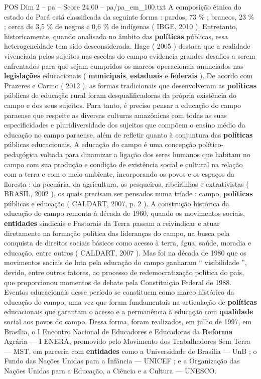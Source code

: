 \begin{textsample}{POS Dim 2 – pa – Score 24.00 – pa/pa\_em\_100.txt}
A composição étnica do estado do Pará está classificada da seguinte forma : pardos, 73 \% ; brancos, 23 \% ; cerca de 3,5 \% de negros e 0,6 \% de indígenas ( IBGE, 2010 ).
Entretanto, historicamente, quando analisada no âmbito das \textbf{políticas} públicas, essa heterogeneidade tem sido desconsiderada.
Hage ( 2005 ) destaca que a realidade vivenciada pelos sujeitos nas escolas do campo evidencia grandes desafios a serem enfrentados para que sejam cumpridos os marcos operacionais anunciados nas \textbf{legislações} educacionais ( \textbf{municipais}, \textbf{estaduais} e \textbf{federais} ).
De acordo com Prazeres e Carmo ( 2012 ), as formas tradicionais que desenvolveram as \textbf{políticas} públicas de educação rural foram desqualificadoras da própria existência do campo e dos seus sujeitos.
Para tanto, é preciso pensar a educação do campo paraense que respeite as diversas culturas amazônicas com todas as suas especificidades e pluridiversidade dos sujeitos que compõem o ensino médio da educação no campo paraense, além de refletir quanto à conjuntura das \textbf{políticas} públicas educacionais.
A educação do campo é uma concepção político-pedagógica voltada para dinamizar a ligação dos seres humanos que habitam no campo com sua produção e condição de existência social e cultural na relação com a terra e com o meio ambiente, incorporando os povos e os espaços da floresta : da pecuária, da agricultura, os pesqueiros, ribeirinhos e extrativistas ( BRASIL, 2002 ), os quais precisam ser pensados numa tríade : campo, \textbf{políticas} públicas e educação ( CALDART, 2007, p. 2 ).
A construção histórica da educação do campo remonta à década de 1960, quando os movimentos sociais, \textbf{entidades} sindicais e Pastorais da Terra passam a reivindicar e atuar diretamente na formação política das lideranças do campo, na busca pela conquista de direitos sociais básicos como acesso à terra, água, saúde, moradia e educação, entre outros ( CALDART, 2007 ).
Mas foi na década de 1980 que os movimentos sociais de luta pela educação do campo ganharam “ visibilidade ”, devido, entre outros fatores, ao processo de redemocratização política do país, que proporcionou momentos de debate pela Constituição Federal de 1988.
Eventos educacionais desse período se constituem como marco histórico da educação do campo, uma vez que foram fundamentais na articulação de \textbf{políticas} educacionais que garantam o acesso e a permanência à educação com \textbf{qualidade} social aos povos do campo.
Dessa forma, foram realizados, em julho de 1997, em Brasília, o I Encontro Nacional de Educadores e Educadoras da \textbf{Reforma} Agrária — I ENERA, promovido pelo Movimento dos Trabalhadores Sem Terra — MST, em parceria com \textbf{entidades} como a Universidade de Brasília — UnB ; o Fundo das Nações Unidas para a Infância — UNICEF ; e a Organização das Nações Unidas para a Educação, a Ciência e a Cultura — UNESCO.

\end{textsample}
